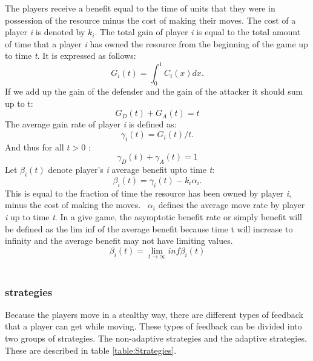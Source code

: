 \documentclass[journal,a4paper]{IEEEtran}
\begin{document}
The players receive a benefit equal to the time of units that they were in possession of the resource minus the cost of making their moves. The cost of a player \textit{i} is denoted by $k_{i}$. 
The total gain of player \textit{i} is equal to the total amount of time that a player \textit{i} has owned the resource from the beginning of the game up to time \textit{t}. It is expressed as follows:
\begin{equation}\label{first}
G_{i}(t) = \int_0^1 \! C_{i}(x) dx.
\end{equation}
If we add up the gain of the defender and the gain of the attacker it should sum up to t:
\begin{equation}\label{first}
G_{D}(t) + G_{A}(t) = t
\end{equation}
The average gain rate of player \textit{i} is defined as:
\begin{equation}\label{first}
\gamma_{i}(t) = G_{i}(t)/t.
\end{equation}
And thus for all $t > 0$ :
\begin{equation}\label{first}
\gamma_{D}(t) + \gamma_{A}(t) = 1
\end{equation}
Let $\beta_{i}(t)$ denote player's \textit{i} average benefit upto time \textit{t}:
\begin{equation}\label{first}
\beta_{i}(t) = \gamma_{i}(t) - k_{i}\alpha_{i}.
\end{equation}
This is equal to the fraction of time the resource has been owned by player \textit{i}, minus the cost of making the moves. ~$ \alpha_{i}$ defines the average move rate by player \textit{i} up to time \textit{t}.
In a give game, the asymptotic benefit rate or simply benefit will be defined as the lim inf of the average benefit because time t will increase to infinity and the average benefit may not have limiting values.
\[ \beta_{i}(t)  = \lim_{t \to \infty} inf \beta_{i}(t)  \]
\\


\subsubsection{strategies}
Because the players move in a stealthy way, there are different types of feedback that a player can get while moving. These types of feedback can be divided into two groups of strategies. The non-adaptive strategies and the adaptive strategies. These are described in table \ref{table:Strategies}. \\
\end{document}
